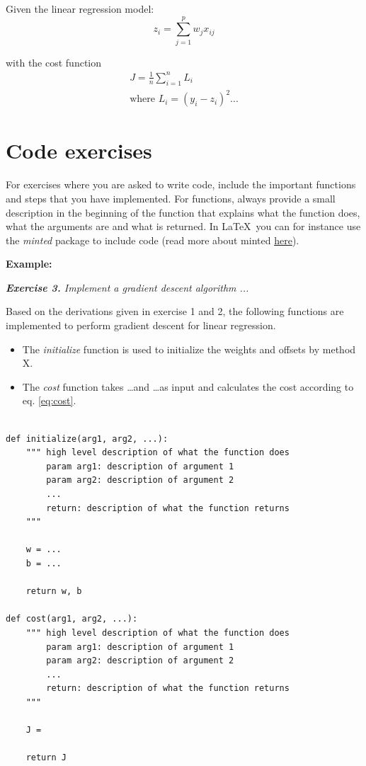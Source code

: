 \documentclass[a4paper,10pt]{article}
\begin{document}
Given the linear regression model:
\begin{equation}
    z_i = \sum_{j=1}^p w_jx_{ij} 
\end{equation}

with the cost function 
\begin{equation}
\label{eq:cost}
\begin{split}
    J = \frac{1}{n}\sum_{i=1}^nL_i \\
    \text{where } L_i = (y_i-z_i)^2...
\end{split}
\end{equation}

\section{Code exercises}

For exercises where you are asked to write code, include the important functions and steps that you have implemented. For functions, always provide a small description in the beginning of the function that explains what the function does, what the arguments are and what is returned. In \LaTeX\ you can for instance use the \emph{minted} package to include code 
(read more about minted \href{https://www.overleaf.com/learn/latex/Code_Highlighting_with_minted}{here}).


\textbf{Example: }

\textit{\textbf{Exercise 3.} Implement a gradient descent algorithm ...}

Based on the derivations given in exercise 1 and 2, the following functions are implemented to perform gradient descent for linear regression. 

\begin{itemize}
\item
The \emph{initialize} function is used to initialize the weights and offsets by method X.
\item
The \emph{cost} function takes \ldots and \ldots as input and calculates the cost according to eq. \eqref{eq:cost}.
\end{itemize}

\begin{verbatim}

def initialize(arg1, arg2, ...):
    """ high level description of what the function does
        param arg1: description of argument 1
        param arg2: description of argument 2
        ...
        return: description of what the function returns
    """
    
    w = ...
    b = ...
    
    return w, b

def cost(arg1, arg2, ...):
    """ high level description of what the function does
        param arg1: description of argument 1
        param arg2: description of argument 2
        ... 
        return: description of what the function returns
    """
    
    J = 
    
    return J

\end{verbatim}
\end{document}

